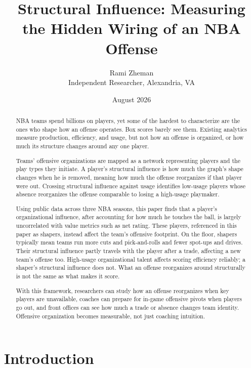 \documentclass[11pt]{article}
\title{\textbf{Structural Influence: Measuring the Hidden Wiring of an NBA Offense}}
\author{Rami Zheman \\ Independent Researcher, Alexandria, VA}
\date{August 2026}
\begin{document}
\maketitle

\begin{abstract}
\noindent
NBA teams spend billions on players, yet some of the hardest to characterize are the ones who
shape how an offense operates. Box scores barely see them.
Existing analytics measure production, efficiency, and usage, but not how an offense is
organized, or how much its structure changes around any one player.

Teams' offensive organizations are mapped as a network representing players and the play types
they initiate. A player's structural influence is how much the graph's shape changes when he is
removed, meaning how much the offense reorganizes if that player were out. Crossing structural
influence against usage identifies low-usage players whose absence reorganizes the offense
comparable to losing a high-usage playmaker.

Using public data across three NBA seasons, this paper finds that a player's organizational
influence, after accounting for how much he touches the ball, is largely uncorrelated with
value metrics such as net rating. These players, referenced in this paper as shapers, instead
affect the team's offensive footprint.
On the floor, shapers typically mean teams run more cuts and pick-and-rolls and fewer spot-ups
and drives. Their structural influence partly travels with the player after a trade, affecting
a new team's offense too. High-usage organizational talent affects scoring efficiency reliably;
a shaper's structural influence does not. What an offense reorganizes around structurally is
not the same as what makes it score.

With this framework, researchers can study how an offense reorganizes when key players are
unavailable, coaches can prepare for in-game offensive pivots when players go out, and front
offices can see how much a trade or absence changes team identity. Offensive organization
becomes measurable, not just coaching intuition.
\end{abstract}
\section{Introduction}
\label{sec:intro}
\end{document}
